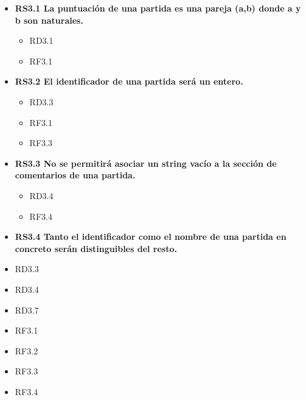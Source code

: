	\begin{itemize}
		\item \textbf{RS3.1 La puntuación de una partida es una pareja (a,b) donde a y b son naturales.}
			\begin{itemize}
				\item RD3.1
				\item RF3.1
			\end{itemize}
		\item \textbf{RS3.2 El identificador de una partida será un entero.}
			\begin{itemize}
				\item RD3.3
				\item RF3.1
				\item RF3.3
			\end{itemize}

		\item \textbf{RS3.3 No se permitirá asociar un string vacío a la sección de comentarios de una partida.}
		\begin{itemize}
			\item RD3.4
			\item RF3.4
		\end{itemize}

		\item \textbf{RS3.4 Tanto el identificador como el nombre de una partida en concreto serán distinguibles del resto.}
		\item RD3.3
		\item RD3.4
		\item RD3.7
		\item RF3.1
		\item RF3.2
		\item RF3.3
		\item RF3.4
	\end{itemize}
